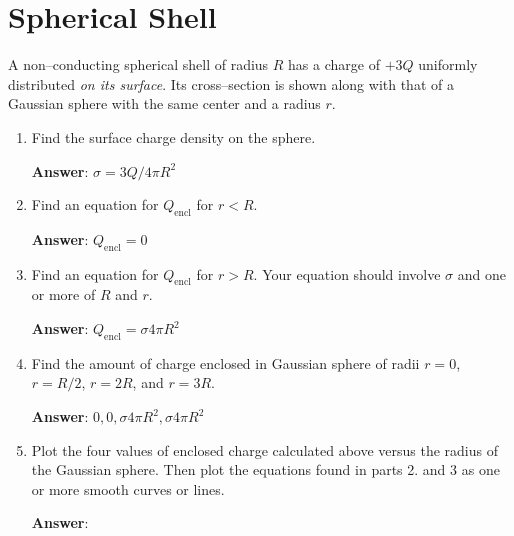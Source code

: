 \documentclass{article}
\begin{document}
\section{Spherical Shell}

A non--conducting spherical shell of radius $R$ has a charge of $+3Q$ uniformly distributed \emph{on its surface}. Its cross--section is shown along with that of a Gaussian sphere with the same center and a radius $r$.



\begin{enumerate}

  \item Find the surface charge density on the sphere.

        \ifsolutions
        {\bf Answer}: $\sigma = 3Q/4\pi R^2$
        \fi

        \ifsolutions\else
        \vskip 36pt
        \fi

  \item Find an equation for $Q_{\text{encl}}$ for $r<R$.

        \ifsolutions
        {\bf Answer}: $Q_{\text{encl}}=0$
        \fi

        \ifsolutions\else
        \vskip 36pt
        \fi

  \item Find an equation for $Q_{\text{encl}}$ for $r>R$. Your equation should involve $\sigma$ and one or more of $R$ and $r$.

        \ifsolutions
        {\bf Answer}: $Q_{\text{encl}}=\sigma 4\pi R^2$
        \fi

        \ifsolutions\else
        \vskip 36pt
        \fi

  \item Find the amount of charge enclosed in Gaussian sphere of radii $r=0$, $r=R/2$, $r=2R$, and $r=3R$.

        \ifsolutions
        {\bf Answer}: $0, 0, \sigma 4 \pi R^2, \sigma 4\pi R^2$
        \fi

        \ifsolutions\else
        \vskip 36pt
        \fi

  \item Plot the four values of enclosed charge calculated above versus the radius of the Gaussian sphere. Then plot the equations found in parts 2. and 3 as one or more smooth curves or lines.

        \ifsolutions
        {\bf Answer}: 

        
        \fi

\end{enumerate}
\end{document}
